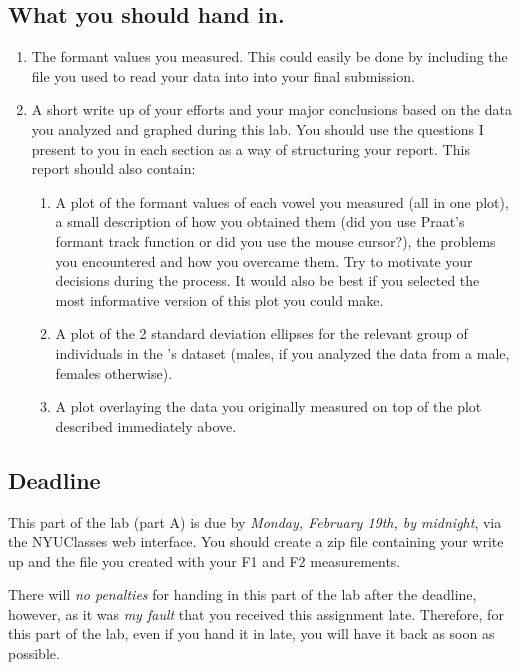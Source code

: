 \subsection{What you should hand in.}

\begin{enumerate}
%
\item The formant values you measured. This could easily be done by including the  file you used to read your data into \Praat{} into your final submission.
%
\item A short write up of your efforts and your major conclusions based on the data you analyzed and graphed during this lab. You should use the questions I present to you in each section as a way of structuring your report. This report should also contain:
% 
   \begin{enumerate}
   \item A plot of the formant values of each vowel you measured (all in one plot), a small description of how you obtained them (did you use Praat's formant track function or did you use the mouse cursor?), the problems you encountered and how you overcame them. Try to motivate your decisions during the process. It would also be best if you selected the most informative version of this plot you could make.
   \item A plot of the 2 standard deviation ellipses for the relevant group of individuals in the 's dataset (males, if you analyzed the data from a male, females otherwise).
   \item A plot overlaying the data you originally measured on top of the plot described immediately above.
   \end{enumerate}
%
\end{enumerate}

\subsection{Deadline}

This part of the lab (part A) is due by \emph{Monday, February 19th, by midnight}, via the NYUClasses web interface. You should create a zip file containing your write up and the  file you created with your F1 and F2 measurements.

There will \emph{no penalties} for handing in this part of the lab after the deadline, however, as it was \emph{my fault} that you received this assignment late. Therefore, for this part of the lab, even if you hand it in late, you will have it back as soon as possible.
